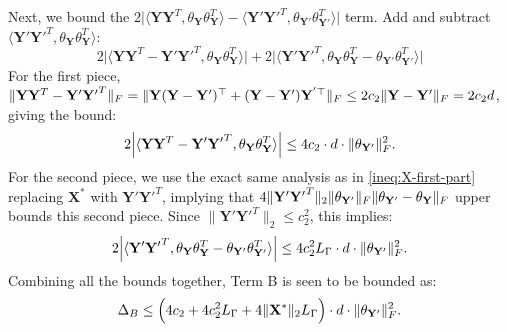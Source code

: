 \documentclass[11pt]{article}
\newcommand{\0}{{\mathbf{0}}}
\newcommand{\1}{{\mathbf{1}}}
\newcommand{\X}{{\mathbf{X}}}
\newcommand{\Y}{{\mathbf{Y}}}
\newcommand{\F}{{\rm F}}
\begin{document}
{{Next, we bound the $ 2 \Big| \langle \mathbf{Y}\mathbf{Y}^T, \theta_{\mathbf{Y}} \theta_{\mathbf{Y}}^T \rangle - \langle \mathbf{Y'}\mathbf{Y'}^T, \theta_{\mathbf{Y'}} \theta_{\mathbf{Y'}}^T \rangle \Big|$ term}. Add and subtract $\langle \mathbf{Y'}\mathbf{Y'}^T, \theta_{\mathbf{Y}} \theta_{\mathbf{Y}}^T \rangle$:
\[
2 \Big| \langle \mathbf{Y}\mathbf{Y}^T - \mathbf{Y'}\mathbf{Y'}^T, \theta_{\mathbf{Y}} \theta_{\mathbf{Y}}^T \rangle \Big| + 2 \Big| \langle \mathbf{Y'}\mathbf{Y'}^T, \theta_{\mathbf{Y}} \theta_{\mathbf{Y}}^T - \theta_{\mathbf{Y'}} \theta_{\mathbf{Y'}}^T \rangle \Big|
\]
For the first piece, $\|\mathbf{Y}\mathbf{Y}^T - \mathbf{Y'}\mathbf{Y'}^T\|_{\F} = \|\Y (\Y - \Y')^{\top } + (\Y - \Y')\Y^{'\top } \|_{\F} \le 2c_2\|\mathbf{Y}-\mathbf{Y'}\|_{\F} = 2c_2 d$, giving the bound:
\[
2 \Big| \langle \mathbf{Y}\mathbf{Y}^T - \mathbf{Y'}\mathbf{Y'}^T, \theta_{\mathbf{Y}} \theta_{\mathbf{Y}}^T \rangle \Big|  \leq 4 c_2 \cdot d \cdot \|\theta_{\mathbf{Y'}}\|_{\F}^2.
\]
For the second piece, we use the exact same analysis as in \eqref{ineq:X-first-part} replacing $\X^*$ with $\mathbf{Y'}\mathbf{Y'}^T$, implying that $4 \|\mathbf{Y'}\mathbf{Y'}^T\|_2 \|\theta_{\mathbf{Y'}}\|_{\F} \|\theta_{\mathbf{Y'}} - \theta_{\mathbf{Y}}\|_{\F}$ upper bounds this second piece. Since $\|\mathbf{Y'}\mathbf{Y'}^T\|_2 \le c_2^2$, this implies:
\[
2 \Big| \langle \mathbf{Y'}\mathbf{Y'}^T, \theta_{\mathbf{Y}} \theta_{\mathbf{Y}}^T - \theta_{\mathbf{Y'}} \theta_{\mathbf{Y'}}^T \rangle \Big| \leq 4 c_2^2 L_{\Gamma} \cdot d \cdot \|\theta_{\mathbf{Y'}}\|_{\F}^2.
\]
Combining all the bounds together, Term B is seen to be bounded as:
\[
\Delta_B \le \Big( 4 c_2 + 4 c_2^2 L_{\Gamma} + 4 \|\X^*\|_2 L_{\Gamma} \Big) \cdot d \cdot \|\theta_{\mathbf{Y'}}\|_{\F}^2.\]


}
\end{document}
